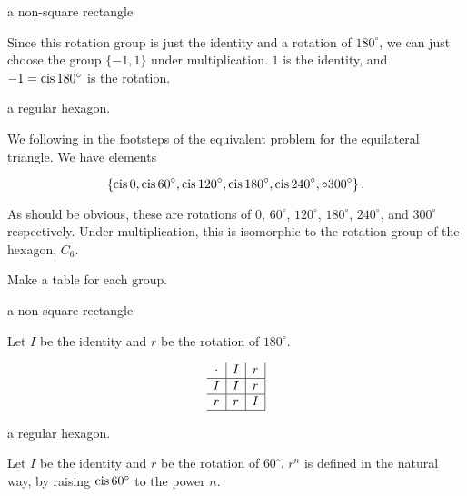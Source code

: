 \documentclass[../key.tex]{subfiles}
\begin{document}
\begin{iinner_problem}[start=1]
\item a non-square rectangle
\end{iinner_problem}

Since this rotation group is just the identity and a rotation of $180^\circ$, we can just choose the group $\{-1,1\}$ under multiplication. $1$ is the identity, and $-1=\operatorname{cis} 180^\circ$ is the rotation.

\begin{iinner_problem}
\item a regular hexagon.
\end{iinner_problem}

We following in the footsteps of the equivalent problem for the equilateral triangle. We have elements

$$\left\{\operatorname{cis} 0, \operatorname{cis} 60^\circ, \operatorname{cis} 120^\circ, \operatorname{cis} 180^\circ, \operatorname{cis} 240^\circ, \circ 300^\circ \right\}.$$

As should be obvious, these are rotations of $0$, $60^\circ$, $120^\circ$, $180^\circ$, $240^\circ$, and $300^\circ$ respectively. Under multiplication, this is isomorphic to the rotation group of the hexagon, $C_6$.

\begin{inner_problem}
\item Make a table for each group.
\end{inner_problem}

\begin{iinner_problem}[start=1]
\item a non-square rectangle
\end{iinner_problem}

Let $I$ be the identity and $r$ be the rotation of $180^\circ$.

$$\begin{array}{c|c|c|}
\cdot & I & r \\ \hline
I & I & r \\ \hline
r & r & I \\ \hline
\end{array}$$

\begin{iinner_problem}
\item a regular hexagon.
\end{iinner_problem}

Let $I$ be the identity and $r$ be the rotation of $60^\circ$. $r^n$ is defined in the natural way, by raising $\operatorname{cis} 60^\circ$ to the power $n$.
\end{document}

